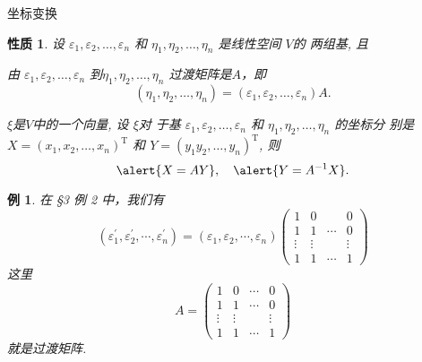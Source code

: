 \documentclass[13pt]{beamer}
\newtheorem{exa}{例}
\newtheorem*{prop}{性质}
\begin{document}
\begin{frame}{坐标变换}
\begin{prop}
设 $\varepsilon_{1}, \varepsilon_{2}, \dots, \varepsilon_{n}$ 和 $\eta_{1}, \eta_{2}, \dots, \eta_{n}$ 是线性空间 $V$的 两组基, 
且

由 $\varepsilon_{1}, \varepsilon_{2}, \ldots, \varepsilon_{n}$ 到$\eta_{1}, \eta_{2}, \ldots, \eta_{n}$ 过渡矩阵是$A$，即 $$\left(\eta_{1}, \eta_{2}, \ldots, \eta_{n}\right)=\left(\varepsilon_{1}, \varepsilon_{2}, \ldots, \varepsilon_{n}\right) A.$$

$\xi$是$V$中的一个向量,  设 $\xi$对 于基 $\varepsilon_{1}, \varepsilon_{2}, \ldots, \varepsilon_{n}$ 和 $\eta_{1}, \eta_{2}, \ldots, \eta_{n}$ 的坐标分
别是 $X=\left({x}_{1}, {x}_{2}, \ldots, {x}_{n}\right)^{\mathrm{T}}$ 和 $Y=\left({y}_{1} {y}_{2}, \ldots, {y}_{n}\right)^{\mathrm{T}}$, 
则
$$ \alert{X=AY}, \quad  \alert{Y=A^{-1}X}.$$
\end{prop}
\end{frame}


\begin{frame}
\begin{exa}
在 \S 3 例 2 中，我们有
\[
\left({\varepsilon}_{1}^{\prime}, {\varepsilon}_{2}^{\prime}, \cdots, {\varepsilon}_{n}^{\prime}\right)=\left({\varepsilon}_{1}, {\varepsilon}_{2}, \cdots, {\varepsilon}_{n}\right)\left(\begin{array}{cccc}
1 & 0 &  & 0 \\
1 & 1 & \cdots & 0 \\
\vdots & \vdots & & \vdots \\
1 & 1 & \cdots & 1
\end{array}\right)
\]
这里
\[
{A}=\left(\begin{array}{cccc}
1 & 0 &\cdots& 0 \\
1 & 1 &\cdots& 0 \\
\vdots & \vdots && \vdots \\
1 & 1 &\cdots& 1
\end{array}\right)
\]
就是过渡矩阵.
\end{exa} 
\end{frame}
\end{document}
